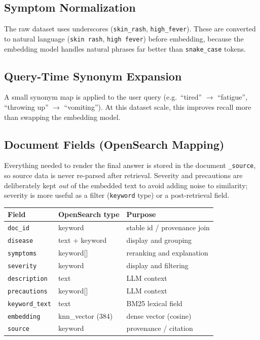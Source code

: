 \documentclass[11pt,a4paper]{article}
\begin{document}
\subsection{Symptom Normalization}

The raw dataset uses underscores (\texttt{skin\_rash}, \texttt{high\_fever}).
These are converted to natural language (\texttt{skin rash},
\texttt{high fever}) before embedding, because the embedding model handles
natural phrases far better than \texttt{snake\_case} tokens.

\subsection{Query-Time Synonym Expansion}

A small synonym map is applied to the user query (e.g.\ ``tired''
$\rightarrow$ ``fatigue'', ``throwing up'' $\rightarrow$ ``vomiting''). At this
dataset scale, this improves recall more than swapping the embedding model.

\subsection{Document Fields (OpenSearch Mapping)}

Everything needed to render the final answer is stored in the document
\texttt{\_source}, so source data is never re-parsed after retrieval. Severity
and precautions are deliberately kept \emph{out} of the embedded text to avoid
adding noise to similarity; severity is more useful as a filter
(\texttt{keyword} type) or a post-retrieval field.

\begin{center}
    \begin{tabular}{|l|l|l|}
        \hline
        Field                  & OpenSearch type   & Purpose                     \\
        \hline
        \texttt{doc\_id}       & keyword           & stable id / provenance join \\
        \texttt{disease}       & text + keyword    & display and grouping        \\
        \texttt{symptoms}      & keyword[]         & reranking and explanation   \\
        \texttt{severity}      & keyword           & display and filtering       \\
        \texttt{description}   & text              & LLM context                 \\
        \texttt{precautions}   & keyword[]         & LLM context                 \\
        \texttt{keyword\_text} & text              & BM25 lexical field          \\
        \texttt{embedding}     & knn\_vector (384) & dense vector (cosine)       \\
        \texttt{source}        & keyword           & provenance / citation       \\
        \hline
    \end{tabular}
\end{center}
\end{document}
